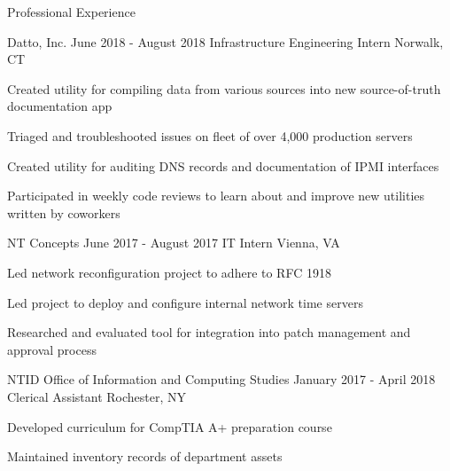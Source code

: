 \documentclass[8pt]{resume} %
\begin{document}
\begin{rSection}{Professional Experience}

    \begin{rSubsection}
        {Datto, Inc.}
        {June 2018 - August 2018}
        {Infrastructure Engineering Intern}
        {Norwalk, CT}
    \item Created utility for compiling data from various sources into new
        source-of-truth documentation app
    \item Triaged and troubleshooted issues on fleet of over 4,000 production
        servers
    \item Created utility for auditing DNS records and documentation of IPMI
        interfaces
    \item Participated in weekly code reviews to learn about and improve new
        utilities written by coworkers
    \end{rSubsection}


    \begin{rSubsection}
        {NT Concepts}
        {June 2017 - August 2017}
        {IT Intern}
        {Vienna, VA}
    \item Led network reconfiguration project to adhere to RFC 1918
    \item Led project to deploy and configure internal network time servers
    \item Researched and evaluated tool for integration into patch management
        and approval process
    \end{rSubsection}


    \begin{rSubsection}
        {NTID Office of Information and Computing Studies}
        {January 2017 - April 2018}
        {Clerical Assistant}
        {Rochester, NY}
    \item Developed curriculum for CompTIA A+ preparation course
    \item Maintained inventory records of department assets
    \end{rSubsection}

\end{rSection}





\end{document}
